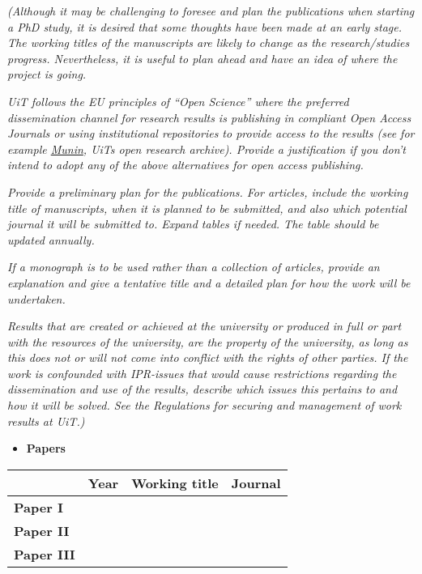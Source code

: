 %
%
\textit{(Although it may be challenging to foresee and plan the publications when starting a PhD study, it is desired that some thoughts have been made at an early stage. The working titles of the manuscripts are likely to change as the research/studies progress. Nevertheless, it is useful to plan ahead and have an idea of where the project is going.}

\textit{UiT follows the EU principles of “Open Science” where the preferred dissemination channel for research results is publishing in compliant Open Access Journals or using institutional repositories to provide access to the results (see for example \href{https://munin.uit.no/}{Munin}, UiTs open research archive).  Provide a justification if you don't intend to adopt any of the above alternatives for open access publishing.}

\textit{Provide a preliminary plan for the publications. For articles, include the working title of manuscripts, when it is planned to be submitted, and also which potential journal it will be submitted to. Expand tables if needed. The table should be updated annually.}

\textit{If a monograph is to be used rather than a collection of articles, provide an explanation and give a tentative title and a detailed plan for how the work will be undertaken.}

\textit{Results that are created or achieved at the university or produced in full or part with the resources of the university, are the property of the university, as long as this does not or will not come into conflict with the rights of other parties. If the work is confounded with IPR-issues that would cause restrictions regarding the dissemination and use of the results, describe which issues this pertains to and how it will be solved. See the Regulations for securing and management of work results at UiT.)}

\begin{itemize}
    \item \textbf{Papers}
\end{itemize}

%
%

\begin{tabularx}{\textwidth}{|l|c|X|l|}
    \hline
    & \textbf{Year} & \textbf{Working title} & \textbf{Journal} \\
    \hline
    \textbf{Paper I} & & & \\
    \hline
    \textbf{Paper II} & & & \\
    \hline
    \textbf{Paper III} & & & \\
    \hline
\end{tabularx}

